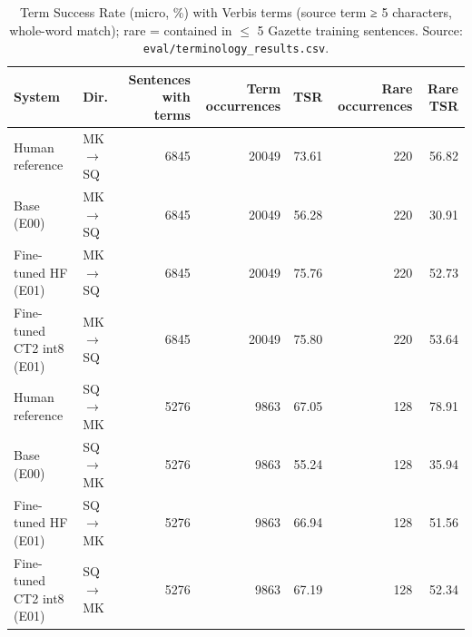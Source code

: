 \begin{table}[t]
\centering
\small
\begin{tabular}{llrrrrr}
\toprule
System & Dir. & Sentences with terms & Term occurrences & TSR & Rare occurrences & Rare TSR \\
\midrule
Human reference & MK$\rightarrow$SQ & 6845 & 20049 & 73.61 & 220 & 56.82 \\
Base (E00) & MK$\rightarrow$SQ & 6845 & 20049 & 56.28 & 220 & 30.91 \\
Fine-tuned HF (E01) & MK$\rightarrow$SQ & 6845 & 20049 & 75.76 & 220 & 52.73 \\
Fine-tuned CT2 int8 (E01) & MK$\rightarrow$SQ & 6845 & 20049 & 75.80 & 220 & 53.64 \\
Human reference & SQ$\rightarrow$MK & 5276 & 9863 & 67.05 & 128 & 78.91 \\
Base (E00) & SQ$\rightarrow$MK & 5276 & 9863 & 55.24 & 128 & 35.94 \\
Fine-tuned HF (E01) & SQ$\rightarrow$MK & 5276 & 9863 & 66.94 & 128 & 51.56 \\
Fine-tuned CT2 int8 (E01) & SQ$\rightarrow$MK & 5276 & 9863 & 67.19 & 128 & 52.34 \\
\bottomrule
\end{tabular}
\caption{Term Success Rate (micro, \%) with Verbis terms (source term ≥ 5 characters, whole-word match); rare = contained in $\leq$ 5 Gazette training sentences. Source: \texttt{eval/terminology\_results.csv}.}
\label{tab:e01-terminology}
\end{table}
